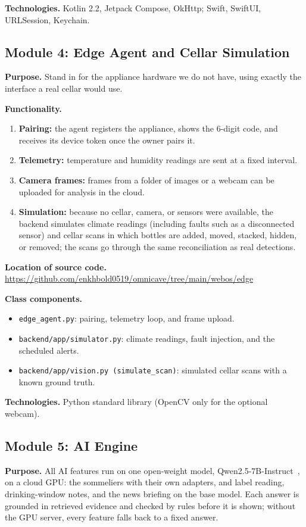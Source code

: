 \documentclass[conference]{IEEEtran}
\begin{document}
\textbf{Technologies.} Kotlin 2.2, Jetpack Compose, OkHttp; Swift, SwiftUI, URLSession, Keychain.

\subsection{Module 4: Edge Agent and Cellar Simulation}
\textbf{Purpose.} Stand in for the appliance hardware we do not have, using exactly the interface a real cellar would use.

\textbf{Functionality.}
\begin{enumerate}
    \item \textbf{Pairing:} the agent registers the appliance, shows the 6-digit code, and receives its device token once the owner pairs it.
    \item \textbf{Telemetry:} temperature and humidity readings are sent at a fixed interval.
    \item \textbf{Camera frames:} frames from a folder of images or a webcam can be uploaded for analysis in the cloud.
    \item \textbf{Simulation:} because no cellar, camera, or sensors were available, the backend simulates climate readings (including faults such as a disconnected sensor) and cellar scans in which bottles are added, moved, stacked, hidden, or removed; the scans go through the same reconciliation as real detections.
\end{enumerate}

\textbf{Location of source code.} \url{https://github.com/enkhbold0519/omnicave/tree/main/webos/edge}

\textbf{Class components.}
\begin{itemize}
    \item \texttt{edge\_agent.py}: pairing, telemetry loop, and frame upload.
    \item \texttt{backend/app/simulator.py}: climate readings, fault injection, and the scheduled alerts.
    \item \texttt{backend/app/vision.py (simulate\_scan)}: simulated cellar scans with a known ground truth.
\end{itemize}

\textbf{Technologies.} Python standard library (OpenCV only for the optional webcam).

\subsection{Module 5: AI Engine}
\textbf{Purpose.} All AI features run on one open-weight model, Qwen2.5-7B-Instruct~\cite{qwen25}, on a cloud GPU: the sommeliers with their own adapters, and label reading, drinking-window notes, and the news briefing on the base model. Each answer is grounded in retrieved evidence and checked by rules before it is shown; without the GPU server, every feature falls back to a fixed answer.
\end{document}
